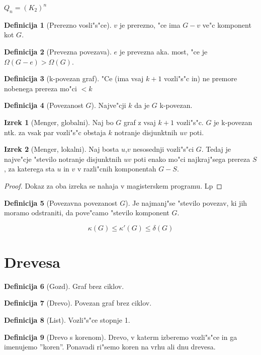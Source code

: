\documentclass{article}
\theoremstyle{definition}
\newtheorem{definition}{Definicija}[section]
\newtheorem{theorem}{Izrek}[section]
\begin{document}
	$Q_n = (K_2)^n$
	
	\begin{definition}[Prerezno vosli"s"ce]
		$v$ je prerezno, "ce ima $G-v$ ve"c komponent kot $G$.
	\end{definition}
	\begin{definition}[Prevezna povezava]
		$e$ je prevezna aka. most, "ce je $\Omega(G-e) > \Omega(G)$.
	\end{definition}
	\begin{definition}[k-povezan graf]
		"Ce (ima vsaj $k+1$ vozli"s"c in) ne premore nobenega prereza mo"ci $< k$
	\end{definition}
	\begin{definition}[Povezanost $G$]
		Najve"cji $k$ da je $G$ k-povezan. 
	\end{definition}

	\begin{theorem}[Menger, globalni]
		Naj bo $G$ graf z vsaj $k+1$ vozli"s"c. $G$ je k-povezan ntk. za vsak par vozli"s"c obstaja $k$ notranje disjunktnih $uv$ poti.
	\end{theorem} 
	\begin{theorem}[Menger, lokalni]
		Naj bosta $u$,$v$ nesosednji vozli"s"ci $G$. Tedaj je najve"cje "stevilo notranje disjunktnih $uv$ poti enako mo"ci najkraj"sega prereza $S$, za katerega sta $u$ in $v$ v razli"cnih komponentah $G-S$.
	\end{theorem}
	\begin{proof}
		Dokaz za oba izreka se nahaja v magisterskem programu. Lp
	\end{proof}
	
	\begin{definition}[Povezavna povezanost $G$]
		Je najmanj"se "stevilo povezav, ki jih moramo odstraniti, da pove"camo "stevilo komponent $G$.
	\end{definition}

	\[ \kappa (G) \leq \kappa '(G) \leq \delta(G) \]
	
	\section{Drevesa}
	\begin{definition}[Gozd]
		Graf brez ciklov.
	\end{definition}
	\begin{definition}[Drevo]
		Povezan graf brez ciklov.
	\end{definition}
	\begin{definition}[List]
		Vozli"s"ce stopnje 1.
	\end{definition}
	\begin{definition}[Drevo s korenom]
		Drevo, v katerm izberemo vozli"s"ce in ga imenujemo ''koren''. Ponavadi ri"semo koren na vrhu ali dnu drevesa.
	\end{definition}
	
\end{document}
